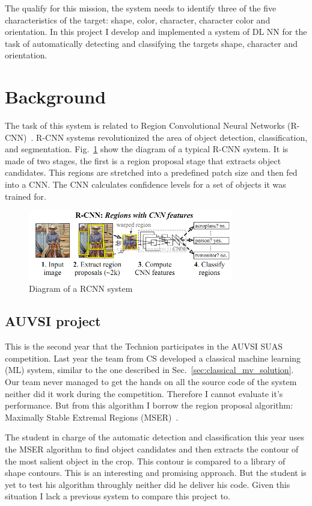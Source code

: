 \documentclass{article} %
\begin{document}
The qualify for this mission, the system needs to identify three of the five
characteristics of the target: shape, color, character, character color and orientation.
In this project I develop and implemented a system of DL NN for the
task of automatically detecting and classifying the targets shape, character
and orientation.

\section{Background}

The task of this system is related to Region Convolutional Neural Networks
(R-CNN)~\cite{Girshick2014}. R-CNN systems revolutionized the area of object detection, classification, and segmentation. Fig.~\ref{fig:RCNN} show the diagram of a typical
R-CNN system. It is made of two stages, the first is a region proposal stage that extracts
object candidates. This regions are stretched into a predefined patch size and then
fed into a CNN. The CNN calculates confidence levels for a set of objects it was trained
for.
\begin{figure}[h]
	\centering
	\includegraphics[width=0.8\textwidth]{RCNN}
	\caption{Diagram of a RCNN system}
	\label{fig:RCNN}
\end{figure}
 
\subsection{AUVSI project}

This is the second year that the Technion participates in the AUVSI SUAS
competition. Last year the team from CS developed a classical machine learning (ML)
system, similar to the one described in Sec.~\ref{sec:classical_mv_solution}.
Our team never managed to get the hands on all the source code of the system
neither did it work during the competition. Therefore I cannot evaluate it's
performance. But from this algorithm I borrow the region proposal algorithm:
Maximally Stable Extremal Regions (MSER)~\cite{Forssen2007}.

The student in charge of the automatic detection and classification this year
uses the MSER algorithm to find object candidates and then extracts
the contour of the most salient object in the crop. This contour is compared
to a library of shape contours. This is an interesting and promising approach.
But the student is yet to test his algorithm throughly neither did he deliver
his code. Given this situation I lack a previous system to compare this project to.
\end{document}

